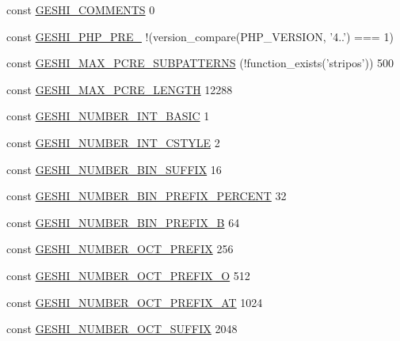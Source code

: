 \begin{DoxyCompactItemize}
const \hyperlink{geshi_8php_ae73b5cf829176b7683fc7bd21312e301}{G\-E\-S\-H\-I\-\_\-\-C\-O\-M\-M\-E\-N\-T\-S} 0
\item 
const \hyperlink{geshi_8php_abb000b37c91b5b05b426aecabddbe3a5}{G\-E\-S\-H\-I\-\_\-\-P\-H\-P\-\_\-\-P\-R\-E\-\_} !(version\-\_\-compare(P\-H\-P\-\_\-\-V\-E\-R\-S\-I\-O\-N, '4..') === 1)
\item 
const \hyperlink{geshi_8php_a06b303abd49f800f6b8a853ccdb578aa}{G\-E\-S\-H\-I\-\_\-\-M\-A\-X\-\_\-\-P\-C\-R\-E\-\_\-\-S\-U\-B\-P\-A\-T\-T\-E\-R\-N\-S} (!function\-\_\-exists('stripos')) 500
\item 
const \hyperlink{geshi_8php_aed8e5439df210544cf31a28d2c2e9e77}{G\-E\-S\-H\-I\-\_\-\-M\-A\-X\-\_\-\-P\-C\-R\-E\-\_\-\-L\-E\-N\-G\-T\-H} 12288
\item 
const \hyperlink{geshi_8php_a02faeead91ea284c9e543b42d17c27b1}{G\-E\-S\-H\-I\-\_\-\-N\-U\-M\-B\-E\-R\-\_\-\-I\-N\-T\-\_\-\-B\-A\-S\-I\-C} 1
\item 
const \hyperlink{geshi_8php_a35ca0577d96258e4a733dacefcaa1c5d}{G\-E\-S\-H\-I\-\_\-\-N\-U\-M\-B\-E\-R\-\_\-\-I\-N\-T\-\_\-\-C\-S\-T\-Y\-L\-E} 2
\item 
const \hyperlink{geshi_8php_a6034fccce93bc6fddb7cd6697bd0392b}{G\-E\-S\-H\-I\-\_\-\-N\-U\-M\-B\-E\-R\-\_\-\-B\-I\-N\-\_\-\-S\-U\-F\-F\-I\-X} 16
\item 
const \hyperlink{geshi_8php_a1b84efb492bbcc75223877bd4def00c2}{G\-E\-S\-H\-I\-\_\-\-N\-U\-M\-B\-E\-R\-\_\-\-B\-I\-N\-\_\-\-P\-R\-E\-F\-I\-X\-\_\-\-P\-E\-R\-C\-E\-N\-T} 32
\item 
const \hyperlink{geshi_8php_a4c428c7fc449c1c4cd21cfd7fb2edd7a}{G\-E\-S\-H\-I\-\_\-\-N\-U\-M\-B\-E\-R\-\_\-\-B\-I\-N\-\_\-\-P\-R\-E\-F\-I\-X\-\_\-B} 64
\item 
const \hyperlink{geshi_8php_a558a29a94472d0414f9888cb5adfa656}{G\-E\-S\-H\-I\-\_\-\-N\-U\-M\-B\-E\-R\-\_\-\-O\-C\-T\-\_\-\-P\-R\-E\-F\-I\-X} 256
\item 
const \hyperlink{geshi_8php_a21059f992b0d80358e79516fb73d3657}{G\-E\-S\-H\-I\-\_\-\-N\-U\-M\-B\-E\-R\-\_\-\-O\-C\-T\-\_\-\-P\-R\-E\-F\-I\-X\-\_\-O} 512
\item 
const \hyperlink{geshi_8php_a59c0b6e00cc6e108f6142b40b90a8bac}{G\-E\-S\-H\-I\-\_\-\-N\-U\-M\-B\-E\-R\-\_\-\-O\-C\-T\-\_\-\-P\-R\-E\-F\-I\-X\-\_\-\-A\-T} 1024
\item 
const \hyperlink{geshi_8php_a6ae313a6370f813f1dbe9b6e969285e2}{G\-E\-S\-H\-I\-\_\-\-N\-U\-M\-B\-E\-R\-\_\-\-O\-C\-T\-\_\-\-S\-U\-F\-F\-I\-X} 2048
\item 

\end{DoxyCompactItemize}
